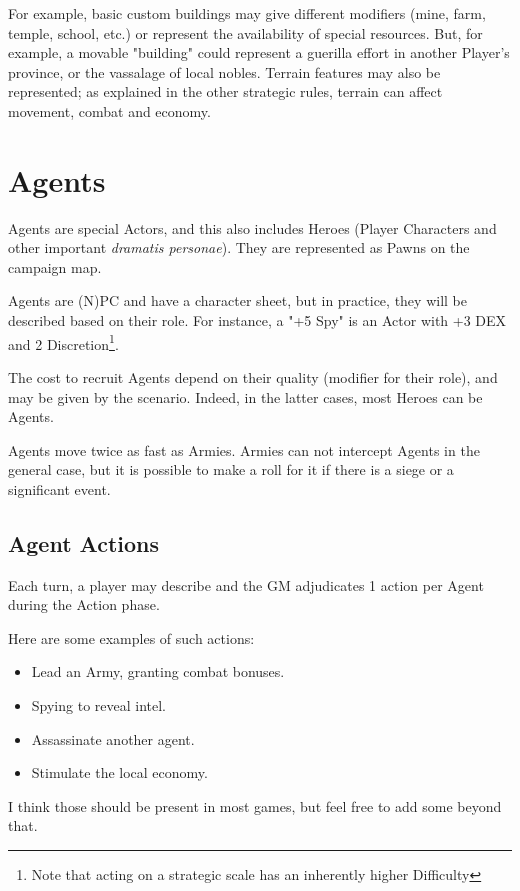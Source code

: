 For example, basic custom buildings may give different modifiers (mine, farm, temple, school, etc.) or represent the availability of special resources. But, for example, a movable "building" could represent a guerilla effort in another Player's province, or the vassalage of local nobles. Terrain features may also be represented; as explained in the other strategic rules, terrain can affect movement, combat and economy.

\section{Agents}

\label{agents}

Agents are special Actors, and this also includes Heroes (Player Characters and other important \textit{dramatis personae}). They are represented as Pawns on the campaign map.

Agents are (N)PC and have a character sheet, but in practice, they will be described based on their role. For instance, a "+5 Spy" is an Actor with +3 DEX and 2 Discretion\footnote{Note that acting on a strategic scale has an inherently higher Difficulty}.

The cost to recruit Agents depend on their quality (modifier for their role), and may be given by the scenario. Indeed, in the latter cases, most Heroes can be Agents.

Agents move twice as fast as Armies. Armies can not intercept Agents in the general case, but it is possible to make a roll for it if there is a siege or a significant event.

\subsection{Agent Actions}

Each turn, a player may describe and the GM adjudicates 1 action per Agent during the Action phase.

Here are some examples of such actions: 

\begin{itemize}
    \item Lead an Army, granting combat bonuses.
    \item Spying to reveal intel.
    \item Assassinate another agent.
    \item Stimulate the local economy.
\end{itemize}

I think those should be present in most games, but feel free to add some beyond that. 


